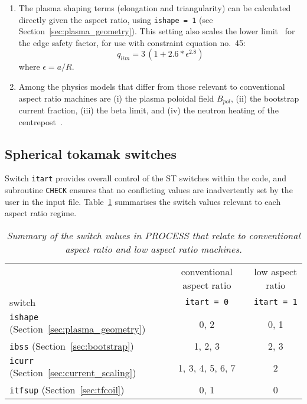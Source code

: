 \documentclass[11pt,a4paper]{report}
\newcommand{\process}{\mbox{\texttt{PROCESS}}}
\begin{document}
\begin{enumerate}
\item The plasma shaping terms (elongation and triangularity) can be
  calculated directly given the aspect ratio, using \texttt{ishape = 1} (see
  Section~\ref{sec:plasma_geometry}). This setting also scales the lower
  limit~\cite{storac} for the edge safety factor, for use with constraint
  equation no.\ 45:
  \begin{equation}
    q_{lim} = 3 \, (1 + 2.6*\epsilon^{2.8})
  \end{equation}
  where $\epsilon = a/R$. 

\item Among the physics models that differ from those relevant to conventional
  aspect ratio machines are (i) the plasma poloidal field $B_{pol}$, (ii) the
  bootstrap current fraction, (iii) the beta limit, and (iv) the neutron
  heating of the centrepost~\cite{storac}.

\end{enumerate}

\subsection{Spherical tokamak switches}

Switch \texttt{itart} provides overall control of the ST switches within the
code, and subroutine \texttt{CHECK} ensures that no conflicting values are
inadvertently set by the user in the input file. Table~\ref{tab:tart}
summarises the switch values relevant to each aspect ratio regime.

\begin{table}[tbph]
\begin{center}
  \begin{tabular}{||l|c|c||} \hline
    & conventional aspect ratio & low aspect ratio \\
    switch & \texttt{itart = 0} & \texttt{itart = 1} \\ \hline
    \texttt{ishape} (Section~\ref{sec:plasma_geometry}) & 0, 2 & 0, 1 \\
    \texttt{ibss} (Section~\ref{sec:bootstrap}) & 1, 2, 3 & 2, 3 \\
    \texttt{icurr} (Section~\ref{sec:current_scaling}) & 1, 3, 4, 5, 6, 7 & 2 \\
    \texttt{itfsup} (Section~\ref{sec:tfcoil}) & 0, 1 & 0 \\
    \hline
\end{tabular}
\end{center}
\caption[\process\ switches for spherical tokamaks]
{\label{tab:tart}
  \textit{Summary of the switch values in PROCESS that relate to
    conventional aspect ratio and low aspect ratio machines.}
}
\end{table}
\end{document}
